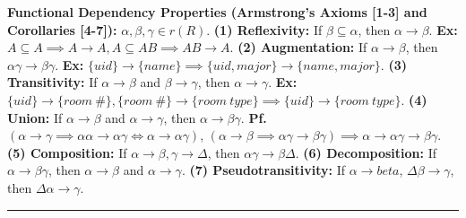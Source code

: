 \documentclass{report}
\renewcommand{\bf}[1]{\textbf{{#1}}}
\begin{document}
\bf{Functional Dependency Properties (Armstrong's Axioms [1-3] and Corollaries [4-7]):} $\alpha, \beta, \gamma \in r(R)$.
\hfil \newline
\bf{(1) Reflexivity:} If $\beta \subseteq \alpha$, then $\alpha \to \beta$. \bf{Ex:} 
$A \subseteq A \implies A \to A, A \subseteq AB \implies AB \to A$.
\hfil \newline
\bf{(2) Augmentation:} If $\alpha \to \beta$, then $\alpha \gamma \to \beta \gamma$. \bf{Ex:}
$\{uid\} \to \{name\} \implies \{uid, major\} \to \{name, major\}$.
\hfil \newline
\bf{(3) Transitivity:} If $\alpha \to \beta$ and $\beta \to \gamma$, then $\alpha \to \gamma$.
\bf{Ex:} $\{uid\} \to \{room \ \#\}, \{room \ \#\} \to \{room \ type\} \implies \{uid\} \to
\{room \ type\}$.
\hfil \newline
\bf{(4) Union:} If $\alpha \to \beta$ and $\alpha \to \gamma$, then $\alpha \to \beta \gamma$.
\bf{Pf.} $(\alpha \to \gamma \implies \alpha \alpha \to \alpha \gamma \iff \alpha \to \alpha \gamma)$, 
$(\alpha \to \beta \implies \alpha \gamma \to \beta \gamma) \implies \alpha \to \alpha \gamma \to
\beta \gamma$.
\hfil \newline
\bf{(5) Composition:} If $\alpha \to \beta, \gamma \to \Delta$, then $\alpha \gamma \to \beta \Delta$. 
\hfil \newline
\bf{(6) Decomposition:} If $\alpha \to \beta \gamma$, then $\alpha \to \beta$ and $\alpha \to \gamma$.
\hfil \newline
\bf{(7) Pseudotransitivity:} If $\alpha \to beta$, $\Delta \beta \to \gamma$, then $\Delta \alpha \to
\gamma$.
\hfil \newline
\vspace{-0.8em}
\hrule
\vspace{0.2em}
\end{document}
